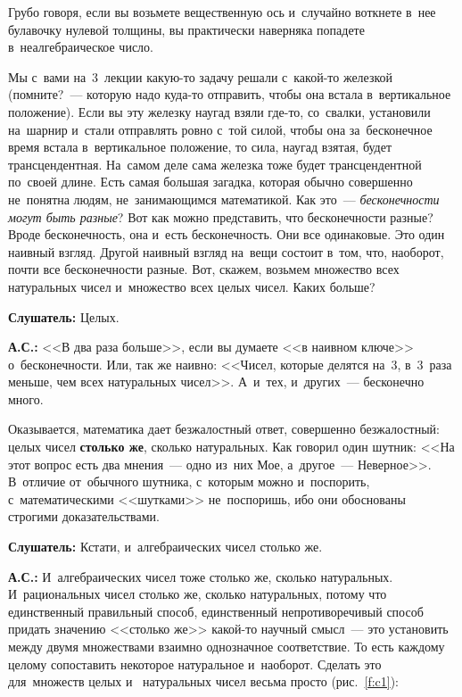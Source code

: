 Грубо говоря, если вы возьмете вещественную ось и~случайно воткнете в~нее булавочку нулевой
толщины, вы практически наверняка попадете в~неалгебраическое число.

Мы с~вами на~3~лекции какую-то задачу решали с~какой-то железкой (помните?~--- которую надо куда-то
отправить, чтобы она встала в~вертикальное положение). Если вы эту железку наугад взяли где-то,
со~свалки, установили на~шарнир и~стали отправлять ровно с~той силой, чтобы она за~бесконечное
время встала в~вертикальное положение, то сила, наугад взятая, будет трансцендентная. На~самом деле
сама железка тоже будет трансцендентной по~своей длине. Есть самая большая загадка, которая обычно
совершенно не~понятна людям, не~занимающимся математикой. Как это~--- \textit{бесконечности могут
быть разные}? Вот как можно представить, что бесконечности разные? Вроде бесконечность, она и~есть
бесконечность. Они все одинаковые. Это один наивный взгляд. Другой наивный взгляд на~вещи состоит
в~том, что, наоборот, почти все бесконечности разные. Вот, скажем, возьмем множество всех
натуральных чисел и~множество всех целых чисел. Каких больше?

\textbf{Слушатель:} Целых.

\textbf{А.С.:} <<В два раза больше>>, если вы думаете <<в наивном ключе>> о~бесконечности. Или, так
же наивно: <<Чисел, которые делятся на~3, в~3~раза меньше, чем всех натуральных чисел>>. А~и~тех,
и~других~--- бесконечно много.

Оказывается, математика дает безжалостный ответ, совершенно безжалостный: целых чисел \textbf{столько же},
сколько натуральных. Как говорил один шутник: <<На этот вопрос есть два мнения~--- одно из~них Мое,
а~другое~--- Неверное>>.\vadjust{\pagebreak} В~отличие от~обычного шутника, с~которым можно и~поспорить,
с~математическими <<шутками>> не~поспоришь, ибо они обоснованы строгими доказательствами.

\textbf{Слушатель:} Кстати, и~алгебраических чисел столько же.

\textbf{А.С.:} И~алгебраических чисел тоже столько же, сколько натуральных. И~рациональных чисел
столько же, сколько натуральных, потому что единственный правильный способ, единственный
непротиворечивый способ придать значению <<столько же>> какой-то научный смысл~--- это установить
между двумя множествами взаимно однозначное соответствие. То есть каждому целому сопоставить
некоторое натуральное и~наоборот. Сделать это для~множеств целых и~ натуральных чисел
весьма просто (рис.~\ref{f:c1}):

